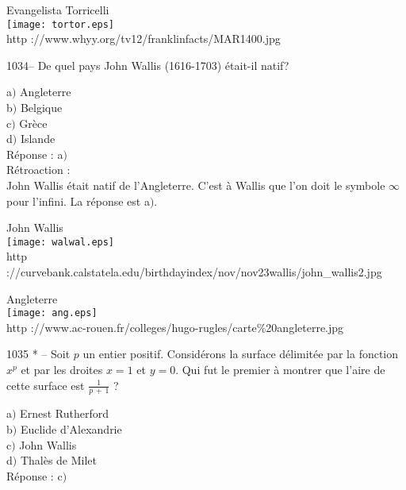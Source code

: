 ﻿\documentclass[letterpaper, 12pt]{article}
\begin{document}
        \begin{center}
        Evangelista Torricelli\\
    \texttt{[image: tortor.eps]}\\
        {\footnotesize http ://www.whyy.org/tv12/franklinfacts/MAR1400.jpg}
    \end{center}

1034-- De quel pays John Wallis (1616-1703) \'etait-il natif?

a$)$ Angleterre \\
b$)$ Belgique \\
c$)$ Gr\`ece  \\
d$)$ Islande \\

R\'eponse : a$)$\\

R\'etroaction :\\
John Wallis \'etait natif de l'Angleterre. C'est \`a Wallis que l'on
doit le symbole $\infty$ pour l'infini.
La r\'eponse est a$)$.\\

        \begin{center}
        John Wallis\\[2mm]
    \texttt{[image: walwal.eps]}\\
        {\footnotesize http
://curvebank.calstatela.edu/birthdayindex/nov/nov23wallis/john\_wallis2.jpg}
    \end{center}

        \begin{center}
        Angleterre\\
    \texttt{[image: ang.eps]}\\
        {\footnotesize http
://www.ac-rouen.fr/colleges/hugo-rugles/carte\%20angleterre.jpg}
    \end{center}

1035 * -- Soit $p$ un entier positif. Consid\'erons la surface
d\'elimit\'ee par la fonction $x^p$ et par les droites $x=1$ et
$y=0$. Qui fut le premier \`a montrer que l'aire de cette surface
est $\frac1{p\,+\,1}$ ?

a$)$ Ernest Rutherford \\
b$)$ Euclide d'Alexandrie  \\
c$)$ John Wallis  \\
d$)$ Thal\`es de Milet \\

R\'eponse : c$)$\\
\end{document}
